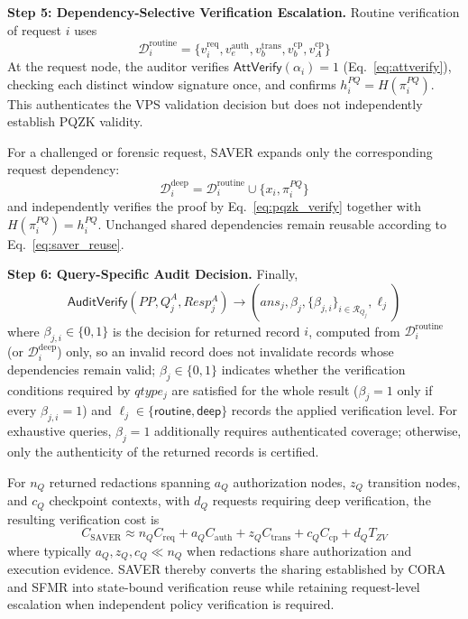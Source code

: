 \documentclass[lettersize,journal]{IEEEtran}
\begin{document}
\medskip
\noindent\textbf{Step 5: Dependency-Selective Verification Escalation.}
Routine verification of request $i$ uses
\begin{equation}
\mathcal{D}_i^{\mathrm{routine}}
=
\{
v_i^{\mathrm{req}},
v_e^{\mathrm{auth}},
v_b^{\mathrm{trans}},
v_b^{\mathrm{cp}},
v_A^{\mathrm{cp}}
\}
\end{equation}
At the request node, the auditor verifies
$\mathsf{AttVerify}(\alpha_i)=1$
(Eq.~\eqref{eq:attverify}), checking each distinct window signature
once,
and confirms $h_i^{PQ}=H(\pi_i^{PQ})$. This authenticates the VPS
validation decision but does not independently establish PQZK validity.

For a challenged or forensic request, SAVER expands only the
corresponding request dependency:
\begin{equation}
\mathcal{D}_i^{\mathrm{deep}}
=
\mathcal{D}_i^{\mathrm{routine}}
\cup
\{x_i,\pi_i^{PQ}\}
\end{equation}
and independently verifies the proof by
Eq.~\eqref{eq:pqzk_verify} together with $H(\pi_i^{PQ})=h_i^{PQ}$.
Unchanged shared dependencies remain reusable according to
Eq.~\eqref{eq:saver_reuse}.

\medskip
\noindent\textbf{Step 6: Query-Specific Audit Decision.}
Finally,
\begin{equation}
\mathsf{AuditVerify}
(PP,Q_j^A,Resp_j^A)
\rightarrow
(ans_j,\beta_j,\{\beta_{j,i}\}_{i\in\mathcal{R}_{Q_j}},\ell_j)
\end{equation}
where $\beta_{j,i}\in\{0,1\}$ is the decision for returned
record $i$, computed from $\mathcal{D}_i^{\mathrm{routine}}$ (or
$\mathcal{D}_i^{\mathrm{deep}}$) only, so an invalid record does not
invalidate records whose dependencies remain valid;
$\beta_j\in\{0,1\}$ indicates whether the verification conditions
required by $qtype_j$ are satisfied for the whole result
($\beta_j=1$ only if every $\beta_{j,i}=1$) and
$\ell_j\in\{\mathsf{routine},\mathsf{deep}\}$ records the applied
verification level. For exhaustive queries, $\beta_j=1$ additionally
requires authenticated coverage; otherwise, only the authenticity of
the returned records is certified.

For $n_Q$ returned redactions spanning $a_Q$ authorization nodes,
$z_Q$ transition nodes, and $c_Q$ checkpoint contexts, with $d_Q$
requests requiring deep verification, the resulting verification cost is
\begin{equation}
C_{\mathrm{SAVER}}
\approx{}
n_QC_{\mathrm{req}}
+a_QC_{\mathrm{auth}}
+z_QC_{\mathrm{trans}}
+c_QC_{\mathrm{cp}}
+d_QT_{ZV}
\label{eq:saver_cost}
\end{equation}
where typically $a_Q,z_Q,c_Q\ll n_Q$ when redactions share
authorization and execution evidence. SAVER thereby converts the sharing established by
CORA and SFMR into state-bound verification reuse while retaining
request-level escalation when independent policy verification is required.
\end{document}
